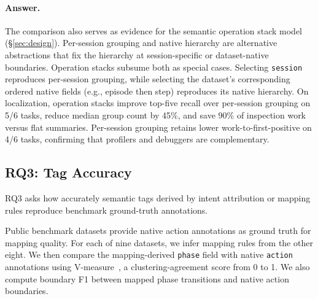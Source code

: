 \documentclass[letterpaper]{article}
\begin{document}
\paragraph{Answer.}
The comparison also serves as evidence for the semantic operation stack model (\S\ref{sec:design}).
Per-session grouping and native hierarchy are alternative abstractions that fix
the hierarchy at session-specific or dataset-native boundaries.
Operation stacks subsume both as special cases. Selecting \texttt{session}
reproduces per-session grouping, while selecting the dataset's corresponding
ordered native fields (e.g., episode then step) reproduces its native hierarchy.
On localization, operation stacks improve top-five recall over per-session
grouping on 5/6 tasks, reduce median group count by 45\%, and save 90\% of
inspection work versus flat summaries.
Per-session grouping retains lower work-to-first-positive on 4/6 tasks, confirming that profilers and debuggers are complementary.

\subsection{RQ3: Tag Accuracy}

RQ3 asks how accurately semantic tags derived by intent attribution or mapping
rules reproduce benchmark ground-truth annotations.

Public benchmark datasets provide native action annotations as ground truth for
mapping quality.
For each of nine datasets, we infer mapping rules from the other eight. We then
compare the mapping-derived \texttt{phase} field with native \texttt{action}
annotations using V-measure~\cite{vmeasure}, a clustering-agreement score from 0 to 1. We also
compute boundary F1 between mapped phase transitions and native action
boundaries.
\end{document}
